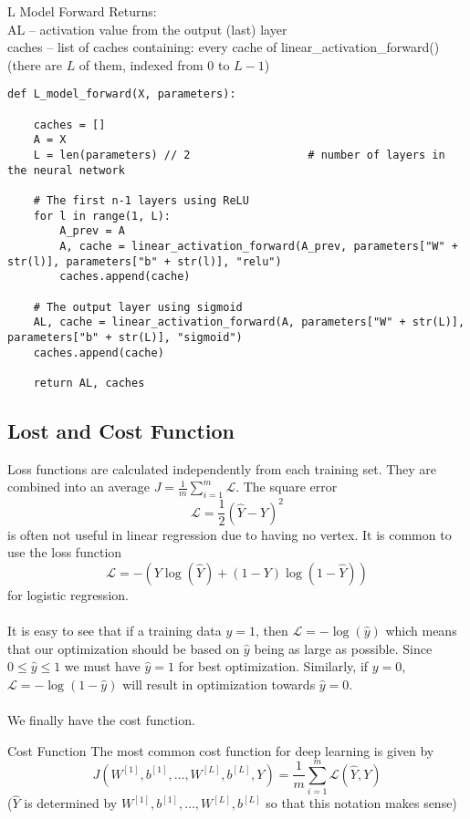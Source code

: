 \documentclass[a4paper]{article}
\begin{document}
\begin{enumerate}
\begin{alg}{L Model Forward}{}
Returns:\\
AL -- activation value from the output (last) layer\\
caches -- list of caches containing: every cache of linear\_activation\_forward() (there are $L$ of them, indexed from $0$ to $L-1$)\\
\begin{verbatim}
def L_model_forward(X, parameters):

    caches = []
    A = X
    L = len(parameters) // 2                  # number of layers in the neural network
    
    # The first n-1 layers using ReLU
    for l in range(1, L):
        A_prev = A 
        A, cache = linear_activation_forward(A_prev, parameters["W" + str(l)], parameters["b" + str(l)], "relu")
        caches.append(cache)

    # The output layer using sigmoid
    AL, cache = linear_activation_forward(A, parameters["W" + str(L)], parameters["b" + str(L)], "sigmoid")
    caches.append(cache)
          
    return AL, caches
\end{verbatim}
\end{alg}

\subsection{Lost and Cost Function}
Loss functions are calculated independently from each training set. They are combined into an average $J=\frac{1}{m}\sum_{i=1}^m\mathcal{L}$. The square error $$\mathcal{L}=\frac{1}{2}(\hat{Y}-Y)^2$$ is often not useful in linear regression due to having no vertex. It is common to use the loss function $$\mathcal{L}=-(Y\log(\hat{Y})+(1-Y)\log(1-\hat{Y}))$$ for logistic regression. \\~\\
It is easy to see that if a training data $y=1$, then $\mathcal{L}=-\log(\hat{y})$ which means that our optimization should be based on $\hat{y}$ being as large as possible. Since $0\leq \hat{y}\leq 1$ we must have $\hat{y}=1$ for best optimization. Similarly, if $y=0$, $\mathcal{L}=-\log(1-\hat{y})$ will result in optimization towards $\hat{y}=0$. \\~\\
We finally have the cost function. 

\begin{defn}{Cost Function}{} The most common cost function for deep learning is given by $$J(W^{[1]},b^{[1]},\dots,W^{[L]},b^{[L]},Y)=\frac{1}{m}\sum_{i=1}^m\mathcal{L}(\hat{Y},Y)$$ ($\hat{Y}$ is determined by $W^{[1]},b^{[1]},\dots,W^{[L]},b^{[L]}$ so that this notation makes sense)
\end{defn}


\end{enumerate}
\end{document}
